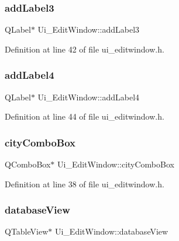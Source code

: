 \subsubsection{\texorpdfstring{addLabel3}{addLabel3}}
{\footnotesize\ttfamily Q\+Label$\ast$ Ui\+\_\+\+Edit\+Window\+::add\+Label3}



Definition at line 42 of file ui\+\_\+editwindow.\+h.

\mbox{\label{class_ui___edit_window_aeac115d010ec9cd47fc5799112d1bd95}} 
\subsubsection{\texorpdfstring{addLabel4}{addLabel4}}
{\footnotesize\ttfamily Q\+Label$\ast$ Ui\+\_\+\+Edit\+Window\+::add\+Label4}



Definition at line 44 of file ui\+\_\+editwindow.\+h.

\mbox{\label{class_ui___edit_window_aa2303bdddb5ab57d70c6845cb43a57de}} 
\subsubsection{\texorpdfstring{cityComboBox}{cityComboBox}}
{\footnotesize\ttfamily Q\+Combo\+Box$\ast$ Ui\+\_\+\+Edit\+Window\+::city\+Combo\+Box}



Definition at line 38 of file ui\+\_\+editwindow.\+h.

\mbox{\label{class_ui___edit_window_abc08309be18778796f46843dbcdd58aa}} 
\subsubsection{\texorpdfstring{databaseView}{databaseView}}
{\footnotesize\ttfamily Q\+Table\+View$\ast$ Ui\+\_\+\+Edit\+Window\+::database\+View}



